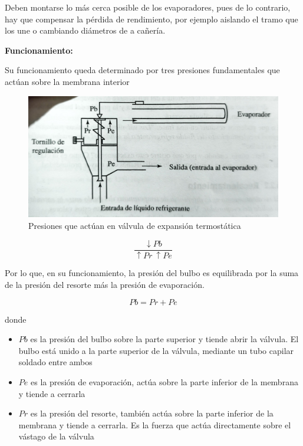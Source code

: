 Deben montarse lo m\'as cerca posible de los evaporadores, pues de lo contrario, hay que compensar la p\'erdida de rendimiento, por ejemplo aislando el tramo que los une o cambiando di\'ametros de a cañería.

\textbf{Funcionamiento:}

Su funcionamiento queda determinado por tres presiones fundamentales que act\'uan sobre la membrana interior
\begin{figure}[H]
    \centering
    \includegraphics[width=.6\linewidth]{figuras/dispositivos-de-expansion/presiones-valvula-expansion.jpg}
    \caption{Presiones que act\'uan en v\'alvula de expansi\'on termost\'atica}
    \label{fig:presiones-valvula-termostatica}
\end{figure}

\begin{equation*}
    \frac{\downarrow Pb}{\uparrow Pr\ \uparrow Pe}
\end{equation*}

Por lo que, en su funcionamiento, la presi\'on del bulbo es equilibrada por la suma de la presi\'on del resorte m\'as la presi\'on de evaporaci\'on.

\begin{equation}
    Pb = Pr + Pe
    \label{eq:igualdad-presiones}
\end{equation}

donde

\begin{itemize}
    \item $Pb$ es la presi\'on del bulbo sobre la parte superior y tiende abrir la v\'alvula. El bulbo est\'a unido a la parte superior de la v\'alvula, mediante un tubo capilar soldado entre ambos
    \item $Pe$ es la presi\'on de evaporaci\'on, act\'ua sobre la parte inferior de la membrana y tiende a cerrarla
    \item $Pr$ es la presi\'on del resorte, tambi\'en act\'ua sobre la parte inferior de la membrana y tiende a cerrarla. Es la fuerza que act\'ua directamente sobre el v\'astago de la v\'alvula
\end{itemize}

